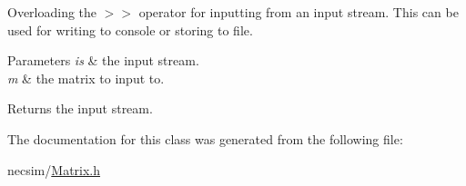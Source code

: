 Overloading the $>$$>$ operator for inputting from an input stream. This can be used for writing to console or storing to file. 


\begin{DoxyParams}{Parameters}
{\em is} & the input stream. \\
\hline
{\em m} & the matrix to input to. \\
\hline
\end{DoxyParams}
\begin{DoxyReturn}{Returns}
the input stream. 
\end{DoxyReturn}


The documentation for this class was generated from the following file\+:\begin{DoxyCompactItemize}
\item 
necsim/\hyperlink{_matrix_8h}{Matrix.\+h}\end{DoxyCompactItemize}
